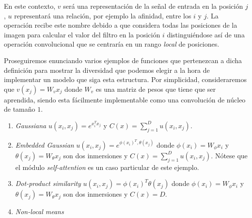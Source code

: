  En este contexto, $v$ será una representación de la señal de entrada en la posición $j$, $u$ representará una relación, por ejemplo la afinidad, entre los $i$ y $j$. La operación recibe este nombre debido a que considera todas las posiciones de la imagen para calcular el valor del filtro en la posición $i$ distinguiéndose así de una operación convolucional que se centraría en un rango \emph{local} de posiciones.%
 
Proseguiremos enunciando varios ejemplos de funciones que pertenezcan a dicha definición para mostrar la diversidad que podemos elegir a la hora de implementar un modelo que siga esta estructura. Por simplicidad, consideraremos que $v(x_j)=W_v x_j$ donde $W_v$ es una matriz de pesos que tiene que ser aprendida, siendo esta fácilmente implementable como una convolución de núcleo de tamaño $1$. 

\begin{enumerate}
\item \emph{Gaussiana} $u(x_i,x_j)=e^{x_i^T x_j}$ y $C(x)= \sum_{j=1}^D u(x_i,x_j)$.
\item \emph{Embedded Gaussian} $u(x_i,x_j)=e^{\phi(x_i)^T,\theta(x_j)}$ donde $\phi(x_i)=W_\phi x_i$ y $\theta(x_j)=W_\theta x_j$ son dos inmersiones y  $C(x)= \sum_{j=1}^D u(x_i,x_j)$. Nótese que el módulo \emph{self-attention} es un caso particular de este ejemplo.
\item \emph{Dot-product similarity} $u(x_i,x_j)=\phi(x_i)^T \theta(x_j)$ donde $\phi(x_i)=W_\phi x_i$ y $\theta(x_j)=W_\theta x_j$ son dos inmersiones y $C(x)=D$.
\item \emph{Non-local means} \cite{}
\end{enumerate}
